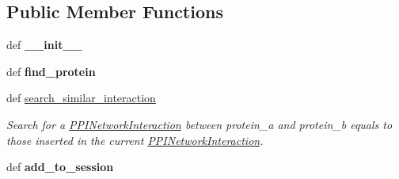 \subsection*{Public Member Functions}
\begin{DoxyCompactItemize}
\item 
\hypertarget{classsrc_1_1fr_1_1tagc_1_1rainet_1_1core_1_1data_1_1PPINetworkInteraction_1_1PPINetworkInteraction_a9f5d74ccbb0f023966b4c0e4e514ba49}{def {\bfseries \-\_\-\-\_\-init\-\_\-\-\_\-}}\label{classsrc_1_1fr_1_1tagc_1_1rainet_1_1core_1_1data_1_1PPINetworkInteraction_1_1PPINetworkInteraction_a9f5d74ccbb0f023966b4c0e4e514ba49}

\item 
\hypertarget{classsrc_1_1fr_1_1tagc_1_1rainet_1_1core_1_1data_1_1PPINetworkInteraction_1_1PPINetworkInteraction_a0cd8cde65c4eac129d9f5846edb2d3da}{def {\bfseries find\-\_\-protein}}\label{classsrc_1_1fr_1_1tagc_1_1rainet_1_1core_1_1data_1_1PPINetworkInteraction_1_1PPINetworkInteraction_a0cd8cde65c4eac129d9f5846edb2d3da}

\item 
def \hyperlink{classsrc_1_1fr_1_1tagc_1_1rainet_1_1core_1_1data_1_1PPINetworkInteraction_1_1PPINetworkInteraction_af220a305321deda17fd40fce9022bf48}{search\-\_\-similar\-\_\-interaction}
\begin{DoxyCompactList}\small\item\em Search for a \hyperlink{classsrc_1_1fr_1_1tagc_1_1rainet_1_1core_1_1data_1_1PPINetworkInteraction_1_1PPINetworkInteraction}{P\-P\-I\-Network\-Interaction} between protein\-\_\-a and protein\-\_\-b equals to those inserted in the current \hyperlink{classsrc_1_1fr_1_1tagc_1_1rainet_1_1core_1_1data_1_1PPINetworkInteraction_1_1PPINetworkInteraction}{P\-P\-I\-Network\-Interaction}. \end{DoxyCompactList}\item 
\hypertarget{classsrc_1_1fr_1_1tagc_1_1rainet_1_1core_1_1data_1_1PPINetworkInteraction_1_1PPINetworkInteraction_ae5bd086943fd14a7fe9bae7a2aaf782d}{def {\bfseries add\-\_\-to\-\_\-session}}\label{classsrc_1_1fr_1_1tagc_1_1rainet_1_1core_1_1data_1_1PPINetworkInteraction_1_1PPINetworkInteraction_ae5bd086943fd14a7fe9bae7a2aaf782d}

\end{DoxyCompactItemize}
